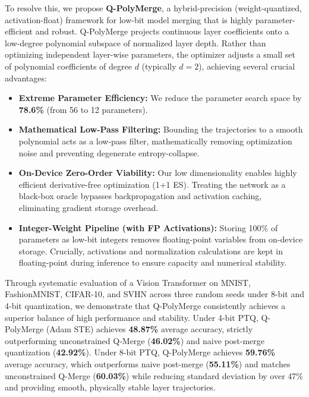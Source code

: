 To resolve this, we propose \textbf{Q-PolyMerge}, a hybrid-precision (weight-quantized, activation-float) framework for low-bit model merging that is highly parameter-efficient and robust. Q-PolyMerge projects continuous layer coefficients onto a low-degree polynomial subspace of normalized layer depth. Rather than optimizing independent layer-wise parameters, the optimizer adjusts a small set of polynomial coefficients of degree $d$ (typically $d=2$), achieving several crucial advantages:
\begin{itemize}
    \item \textbf{Extreme Parameter Efficiency:} We reduce the parameter search space by \textbf{78.6\%} (from 56 to 12 parameters).
    \item \textbf{Mathematical Low-Pass Filtering:} Bounding the trajectories to a smooth polynomial acts as a low-pass filter, mathematically removing optimization noise and preventing degenerate entropy-collapse.
    \item \textbf{On-Device Zero-Order Viability:} Our low dimensionality enables highly efficient derivative-free optimization (1+1 ES). Treating the network as a black-box oracle bypasses backpropagation and activation caching, eliminating gradient storage overhead.
    \item \textbf{Integer-Weight Pipeline (with FP Activations):} Storing 100\% of parameters as low-bit integers removes floating-point variables from on-device storage. Crucially, activations and normalization calculations are kept in floating-point during inference to ensure capacity and numerical stability.
\end{itemize}

Through systematic evaluation of a Vision Transformer on MNIST, FashionMNIST, CIFAR-10, and SVHN across three random seeds under 8-bit and 4-bit quantization, we demonstrate that Q-PolyMerge consistently achieves a superior balance of high performance and stability. Under 4-bit PTQ, Q-PolyMerge (Adam STE) achieves \textbf{48.87\%} average accuracy, strictly outperforming unconstrained Q-Merge (\textbf{46.02\%}) and naive post-merge quantization (\textbf{42.92\%}). Under 8-bit PTQ, Q-PolyMerge achieves \textbf{59.76\%} average accuracy, which outperforms naive post-merge (\textbf{55.11\%}) and matches unconstrained Q-Merge (\textbf{60.03\%}) while reducing standard deviation by over 47\% and providing smooth, physically stable layer trajectories.


